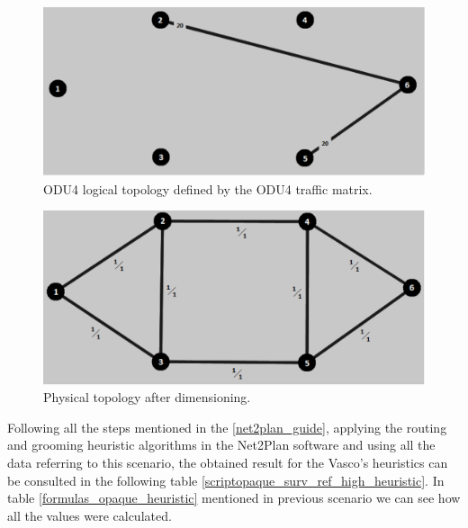 \begin{figure}[H]
\centering
\includegraphics[width=13cm]{sdf/heuristic/opaque_survivability/figures/logical_topology_odu4_high}
\caption{ODU4 logical topology defined by the ODU4 traffic matrix.}
\label{logical_ODU4_surv_ref_high_heuristic}
\end{figure}

\begin{figure}[H]
\centering
\includegraphics[width=13cm]{sdf/heuristic/opaque_survivability/figures/physical_topology}
\caption{Physical topology after dimensioning.}
\label{physical_topology_surv_ref_high_heuristic}
\end{figure}

Following all the steps mentioned in the \ref{net2plan_guide}, applying the routing and grooming heuristic algorithms in the Net2Plan software and using all the data referring to this scenario, the obtained result for the Vasco's heuristics can be consulted in the following table \ref{scriptopaque_surv_ref_high_heuristic}. In table \ref{formulas_opaque_heuristic} mentioned in previous scenario we can see how all the values were calculated.\\

